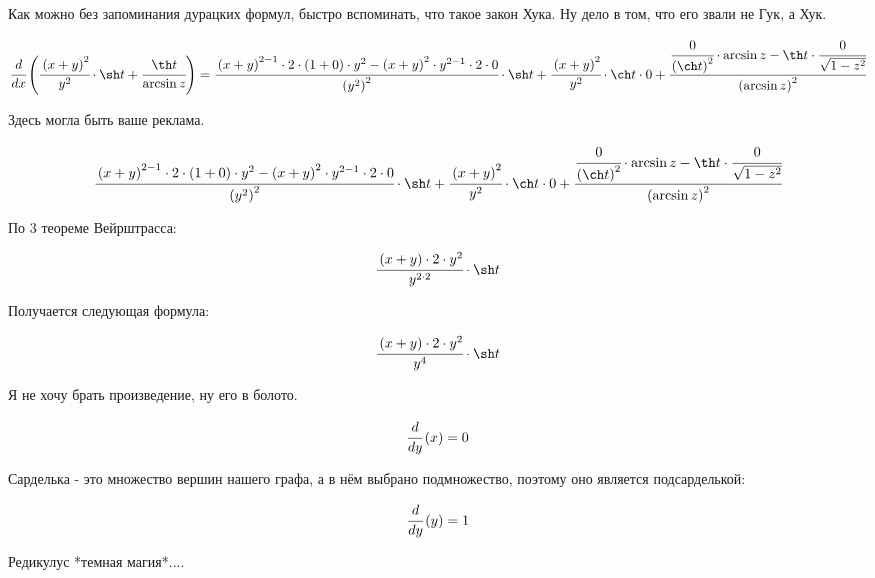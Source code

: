 Как можно без запоминания дурацких формул, быстро вспоминать, что такое закон Хука. Ну дело в том, что его звали не Гук, а Хук.


\begin{dmath}
 \cfrac{d}{d x} \left( \cfrac{\left(x + y\right)^{2}}{y^{2}} \cdot \sh t + \cfrac{\th t}{\arcsin z} \right) = \cfrac{\left(x + y\right)^{2 - 1} \cdot 2 \cdot \left(1 + 0\right) \cdot y^{2} - \left(x + y\right)^{2} \cdot y^{2 - 1} \cdot 2 \cdot 0}{\left(y^{2}\right)^{2}} \cdot \sh t + \cfrac{\left(x + y\right)^{2}}{y^{2}} \cdot \ch t \cdot 0 + \cfrac{\cfrac{0}{\left(\ch t\right)^{2}} \cdot \arcsin z - \th t \cdot \cfrac{0}{\sqrt{  1 - z^{2}}}}{\left(\arcsin z\right)^{2}} 
\end{dmath}


Здесь могла быть ваше реклама.


\begin{dmath}
\cfrac{\left(x + y\right)^{2 - 1} \cdot 2 \cdot \left(1 + 0\right) \cdot y^{2} - \left(x + y\right)^{2} \cdot y^{2 - 1} \cdot 2 \cdot 0}{\left(y^{2}\right)^{2}} \cdot \sh t + \cfrac{\left(x + y\right)^{2}}{y^{2}} \cdot \ch t \cdot 0 + \cfrac{\cfrac{0}{\left(\ch t\right)^{2}} \cdot \arcsin z - \th t \cdot \cfrac{0}{\sqrt{  1 - z^{2}}}}{\left(\arcsin z\right)^{2}}
\end{dmath}


По 3 теореме Вейрштрасса:


\begin{dmath}
\cfrac{\left(x + y\right) \cdot 2 \cdot y^{2}}{y^{2 \cdot 2}} \cdot \sh t
\end{dmath}


Получается следующая формула:


\begin{dmath}
\cfrac{\left(x + y\right) \cdot 2 \cdot y^{2}}{y^{4}} \cdot \sh t
\end{dmath}


Я не хочу брать произведение, ну его в болото.


\begin{dmath}
 \cfrac{d}{d y} \left( x \right) = 0 
\end{dmath}


Сарделька - это множество вершин нашего графа, а в нём выбрано подмножество, поэтому оно является подсарделькой:


\begin{dmath}
 \cfrac{d}{d y} \left( y \right) = 1 
\end{dmath}


Редикулус *темная магия*....


